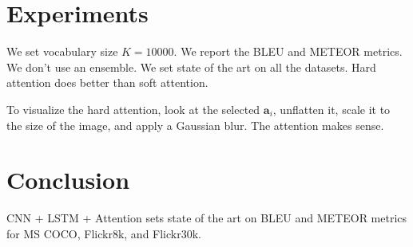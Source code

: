 \documentclass[a4paper]{article}
\begin{document}
\section{Experiments}
We set vocabulary size $K = 10000$. We report the BLEU and METEOR metrics. We
don't use an ensemble. We set state of the art on all the datasets. Hard
attention does better than soft attention.

To visualize the hard attention, look at the selected $\mathbf{a}_i$, unflatten
it, scale it to the size of the image, and apply a Gaussian blur. The attention
makes sense.

\section{Conclusion}
CNN + LSTM + Attention sets state of the art on BLEU and METEOR metrics for
MS COCO, Flickr8k, and Flickr30k.
\end{document}
